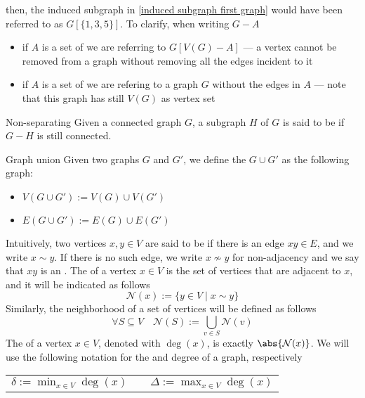 \documentclass[a4paper, 12pt]{report}
\begin{document}
    then, the induced subgraph in \cref{induced subgraph first graph} would have been referred to as $G[\{1, 3, 5\}]$. To clarify, when writing $G - A$

    \begin{itemize}
        \item if $A$ is a set of  we are referring to $G[V(G) - A]$ --- a vertex cannot be removed from a graph without removing all the edges incident to it
        \item if $A$ is a set of  we are refering to a graph $G$ without the edges in $A$ --- note that this graph has still $V(G)$ as vertex set
    \end{itemize}

    \begin{frameddefn}{Non-separating}
        Given a connected graph $G$, a subgraph $H$ of $G$ is said to be  if $G - H$ is still connected.
    \end{frameddefn}

    \begin{frameddefn}{Graph union}
        Given two graphs $G$ and $G'$, we define the  $G \cup G'$ as the following graph:

        \begin{itemize}
            \item $V(G \cup G') := V(G) \cup V(G')$
            \item $E(G \cup G') := E(G) \cup E(G')$ 
        \end{itemize}
    \end{frameddefn}

    Intuitively, two vertices $x, y \in V$ are said to be  if there is an edge $xy \in E$, and we write $x \sim y$. If there is no such edge, we write $x \nsim y$ for non-adjacency and we say that $xy$ is an . The  of a vertex $x \in V$ is the set of vertices that are adjacent to $x$, and it will be indicated as follows $$\mathcal N (x) := \{y \in V \mid x \sim y\}$$ Similarly, the neighborhood of a set of vertices will be defined as follows $$\forall S \subseteq V \quad \mathcal N(S) := \bigcup_{v \in S}{\mathcal N (v)}$$ The  of a vertex $x \in V$, denoted with $\deg(x)$, is exactly $\abs{\mathcal N (x)}$. We will use the following notation for the  and  degree of a graph, respectively

    \begin{center}
        \begin{tabular}{ccc}
            $\displaystyle \delta := \min_{x \in V}{\deg(x)}$ & \qquad & $\displaystyle \Delta := \max_{x \in V}{\deg(x)}$
        \end{tabular}
    \end{center}
\end{document}
